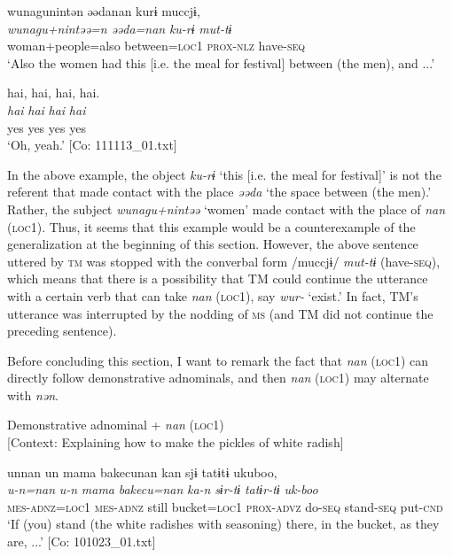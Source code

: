 {\TM}
\gll wunagunintən  əədanan  kurɨ  muccjɨ,\\
\textit{wunagu+nintəə=n}  \textit{əəda=nan}  \textit{ku-rɨ}  \textit{mut-tɨ}\\
    woman+people=also  between=\textsc{loc1}  \textsc{prox}-\textsc{nlz}  have-\textsc{seq}\\
\glt    ‘Also the women had this [i.e. the meal for festival] between (the men), and ...’

{\MS}
\glll   {\textbar}hai,  hai,  hai,  hai.{\textbar}\\
    \textit{hai}  \textit{hai}  \textit{hai}  \textit{hai}\\
    yes  yes  yes  yes\\
\glt    ‘Oh, yeah.’ [Co: 111113\_01.txt]
\z

In the above example, the object \textit{ku-rɨ} ‘this [i.e. the meal for festival]’ is not the referent that made contact with the place \textit{əəda} ‘the space between (the men).’ Rather, the subject \textit{wunagu+nintəə} ‘women’ made contact with the place of \textit{nan} (\textsc{loc1}). Thus, it seems that this example would be a counterexample of the generalization at the beginning of this section. However, the above sentence uttered by \textsc{tm} was stopped with the converbal form /muccjɨ/ \textit{mut-tɨ} (have-\textsc{seq}), which means that there is a possibility that TM could continue the utterance with a certain verb that can take \textit{nan} (\textsc{loc1}), say \textit{wur-} ‘exist.’ In fact, TM’s utterance was interrupted by the nodding of \textsc{ms} (and TM did not continue the preceding sentence).

Before concluding this section, I want to remark the fact that \textit{nan} (\textsc{loc1}) can directly follow demonstrative adnominals, and then \textit{nan} (\textsc{loc1}) may alternate with \textit{nən}.

\ea\label{ex:6-64}
\ea Demonstrative adnominal + \textit{nan} (\textsc{loc1})\\{}
[Context: Explaining how to make the pickles of white radish]

{\TM}
\glll unnan  un  mama  {\textbar}bakecu{\textbar}nan  kan   sjɨ  tatɨtɨ  ukuboo,\\
      \textit{u-n=nan}  \textit{u-n}  \textit{mama}  \textit{bakecu=nan}  \textit{ka-n} \textit{sɨr-tɨ}  \textit{tatɨr-tɨ}  \textit{uk-boo}\\
      \textsc{mes}-\textsc{adnz}=\textsc{loc1}  \textsc{mes}-\textsc{adnz}  still  bucket=\textsc{loc1}  \textsc{prox}-\textsc{advz}      do-\textsc{seq}  stand-\textsc{seq}  put-\textsc{cnd}\\
\glt ‘If (you) stand (the white radishes with seasoning) there, in the bucket, as they are, ...’ [Co: 101023\_01.txt]


